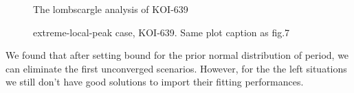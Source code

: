 \documentclass{aastex62}
\newcommand\aastex{AAS\TeX}
\begin{document}
\begin{figure}
\caption{The lombscargle analysis of KOI-639}
\end{figure}

\begin{figure}
\caption{extreme-local-peak case, KOI-639. Same plot caption as fig.7}
\end{figure}

We found that after setting bound for the prior normal distribution of period, we can eliminate the first unconverged scenarios. However, for the the left situations we still don't have good solutions to import their fitting performances.




\begin{thebibliography}{}

\end{thebibliography}


\end{document}
